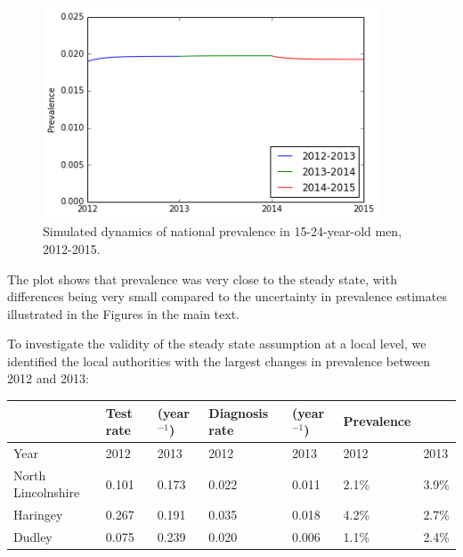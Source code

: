 \documentclass{article}
\begin{document}
    \begin{figure}
        \begin{center}\includegraphics[width=10cm]{three_compartment_model_files/three_compartment_model_17_1.png}\end{center}
        \caption{Simulated dynamics of national prevalence in 15-24-year-old men, 2012-2015.}
        \label{}
    \end{figure}
    
    The plot shows that prevalence was very close to the steady state, with
differences being very small compared to the uncertainty in prevalence
estimates illustrated in the Figures in the main text.

To investigate the validity of the steady state assumption at a local
level, we identified the local authorities with the largest changes in
prevalence between 2012 and 2013:

\begin{longtable}[c]{@{}lllllll@{}}
\toprule
& Test rate & (year\(^{-1}\)) & Diagnosis rate & (year\(^{-1}\)) &
Prevalence &\tabularnewline
\midrule
\endhead
Year & 2012 & 2013 & 2012 & 2013 & 2012 & 2013\tabularnewline
North Lincolnshire & 0.101 & 0.173 & 0.022 & 0.011 & 2.1\% &
3.9\%\tabularnewline
Haringey & 0.267 & 0.191 & 0.035 & 0.018 & 4.2\% & 2.7\%\tabularnewline
Dudley & 0.075 & 0.239 & 0.020 & 0.006 & 1.1\% & 2.4\%\tabularnewline
\bottomrule
\end{longtable}
\end{document}
